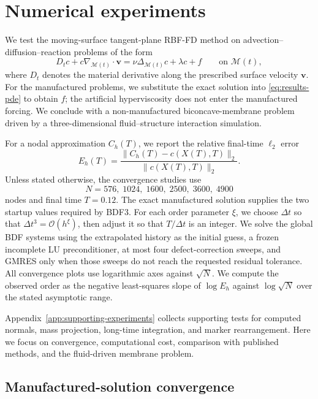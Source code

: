 \documentclass[a4paper,fleqn]{cas-sc}
\begin{document}
\section{Numerical experiments}
\label{sec:numerical-experiments}

We test the moving-surface tangent-plane RBF-FD method on
advection--diffusion--reaction problems of the form
\begin{equation}
  D_t c + c\nabla_{\mathcal M(t)}\!\cdot\bm v
  =
  \nu\Delta_{\mathcal M(t)}c+\lambda c+f
  \qquad\text{on }\mathcal M(t),
  \label{eq:results-pde}
\end{equation}
where \(D_t\) denotes the material derivative along the prescribed surface
velocity \(\bm v\).  For the manufactured problems, we substitute the exact
solution into \eqref{eq:results-pde} to obtain \(f\); the artificial
hyperviscosity does not enter the manufactured forcing.  We conclude with a
non-manufactured biconcave-membrane problem driven by a three-dimensional
fluid--structure interaction simulation.

For a nodal approximation \(C_h(T)\), we report the relative final-time
\(\ell_2\) error
\begin{equation}
  E_h(T)
  =
  \frac{\|C_h(T)-c(X(T),T)\|_2}
       {\|c(X(T),T)\|_2}.
  \label{eq:results-relative-error}
\end{equation}
Unless stated otherwise, the convergence studies use
\[
  N=576,\;1024,\;1600,\;2500,\;3600,\;4900
\]
nodes and final time \(T=0.12\).  The exact manufactured solution supplies the
two startup values required by BDF3.  For each order parameter \(\xi\), we
choose \(\Delta t\) so that
\(\Delta t^3=\mathcal O(h^\xi)\), then adjust it so that \(T/\Delta t\) is an
integer.  We solve the global BDF systems using the extrapolated history as the
initial guess, a frozen incomplete LU preconditioner, at most four
defect-correction sweeps, and GMRES only when those sweeps do not reach the
requested residual tolerance.  All convergence plots use logarithmic axes
against \(\sqrt N\).  We compute the observed order as the negative
least-squares slope of \(\log E_h\) against \(\log\sqrt N\) over the stated
asymptotic range.

Appendix~\ref{app:supporting-experiments} collects supporting tests for
computed normals, mass projection, long-time integration, and marker
rearrangement.  Here we focus on convergence, computational cost, comparison
with published methods, and the fluid-driven membrane problem.

\subsection{Manufactured-solution convergence}
\label{subsec:manufactured-convergence}
\end{document}

